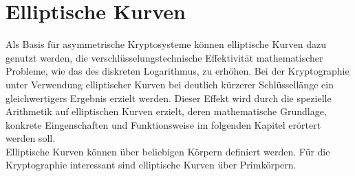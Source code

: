 \chapter{Elliptische Kurven}


Als Basis für asymmetrische Kryptosysteme können elliptische Kurven dazu genutzt werden, die verschlüsselungstechnische Effektivität mathematischer Probleme, wie das des diskreten Logarithmus, zu erhöhen. Bei der Kryptographie unter Verwendung elliptischer Kurven bei deutlich kürzerer Schlüssellänge ein gleichwertigers Ergebnis erzielt werden. Dieser Effekt wird durch die spezielle Arithmetik auf elliptischen Kurven erzielt, deren mathematische Grundlage, konkrete Eingenschaften und Funktionsweise im folgenden Kapitel erörtert werden soll.\\

Elliptische Kurven können über beliebigen Körpern definiert werden. Für die Kryptographie interessant sind elliptische Kurven über Primkörpern.





